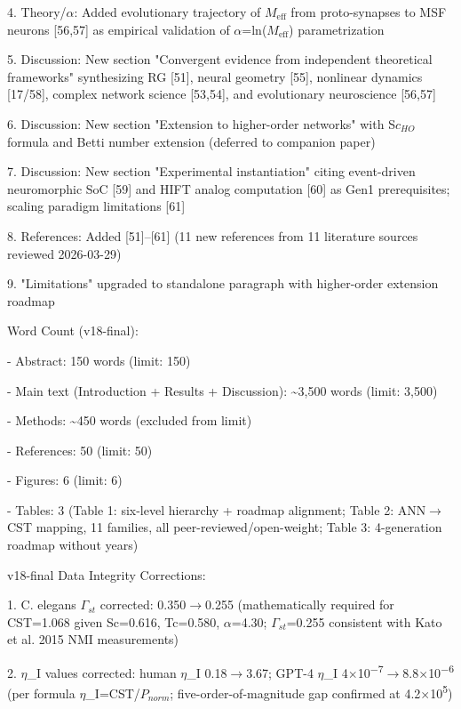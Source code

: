 \documentclass[a4paper,12pt]{article}
\begin{document}
4. Theory/$\alpha$: Added evolutionary trajectory of $M_{\text{eff}}$ from proto-synapses to MSF neurons [56,57] as empirical validation of $\alpha$=ln($M_{\text{eff}}$) parametrization

5. Discussion: New section "Convergent evidence from independent theoretical frameworks" synthesizing RG [51], neural geometry [55], nonlinear dynamics [17/58], complex network science [53,54], and evolutionary neuroscience [56,57]

6. Discussion: New section "Extension to higher-order networks" with S$c_{HO}$ formula and Betti number extension (deferred to companion paper)

7. Discussion: New section "Experimental instantiation" citing event-driven neuromorphic SoC [59] and HIFT analog computation [60] as Gen1 prerequisites; scaling paradigm limitations [61]

8. References: Added [51]--[61] (11 new references from 11 literature sources reviewed 2026-03-29)

9. "Limitations" upgraded to standalone paragraph with higher-order extension roadmap

Word Count (v18-final):

- Abstract: 150 words \checkmark (limit: 150)

- Main text (Introduction + Results + Discussion): \textasciitilde{}3,500 words \checkmark (limit: 3,500)

- Methods: \textasciitilde{}450 words (excluded from limit)

- References: 50 \checkmark (limit: 50)

- Figures: 6 \checkmark (limit: 6)

- Tables: 3 (Table 1: six-level hierarchy + roadmap alignment; Table 2: ANN$\rightarrow$CST mapping, 11 families, all peer-reviewed/open-weight; Table 3: 4-generation roadmap without years)

v18-final Data Integrity Corrections:

1. C. elegans $\Gamma_{st}$ corrected: 0.350$\rightarrow$0.255 (mathematically required for CST=1.068 given Sc=0.616, Tc=0.580, $\alpha$=4.30; $\Gamma_{st}$=0.255 consistent with Kato et al. 2015 NMI measurements)

2. $\eta$_I values corrected: human $\eta$_I 0.18$\rightarrow$3.67; GPT-4 $\eta$_I 4$\times$10\textsuperscript{$-$}\textsuperscript{7}$\rightarrow$8.8$\times$10\textsuperscript{$-$}\textsuperscript{6} (per formula $\eta$_I=CST/$P_{norm}$; five-order-of-magnitude gap confirmed at 4.2$\times$10\textsuperscript{5})
\end{document}
